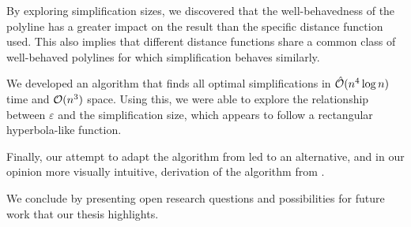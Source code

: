 By exploring simplification sizes, we discovered that the well-behavedness of the polyline has a greater impact on the result than the specific distance function used. This also implies that different distance functions share a common class of well-behaved polylines for which simplification behaves similarly.

We developed an algorithm that finds all optimal simplifications in \(\hat{\mathcal{O}}(n^4\log n)\) time and \(\mathcal{O}(n^3)\) space. Using this, we were able to explore the relationship between \(\varepsilon\) and the simplification size, which appears to follow a rectangular hyperbola-like function.

Finally, our attempt to adapt the algorithm from \citeauthor{computational_geometric_methods_for_polygonal_approximations_of_a_curve} led to an alternative, and in our opinion more visually intuitive, derivation of the algorithm from \citeauthor{global_curve_simplification}.

We conclude by presenting open research questions and possibilities for future work that our thesis highlights.


